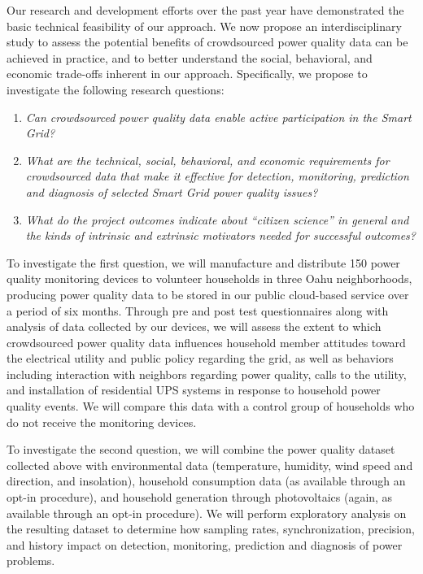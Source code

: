 Our research and development efforts over the past year have demonstrated the basic technical feasibility of our approach.   We now propose an interdisciplinary study to assess the potential benefits of crowdsourced power quality data can be achieved in practice, and to better understand the social, behavioral, and economic trade-offs inherent in our approach.  Specifically, we propose to investigate the following research questions:

\begin{enumerate}

\item {\em Can crowdsourced power quality data enable active participation in the Smart Grid?}

\item {\em What are the technical, social, behavioral, and economic requirements for crowdsourced data that make it effective for detection, monitoring, prediction and diagnosis of selected Smart Grid power quality issues?}

\item {\em What do the project outcomes indicate about ``citizen science'' in general and the kinds of intrinsic and extrinsic motivators needed for successful outcomes?}

\end{enumerate}

To investigate the first question, we will manufacture and distribute 150 power quality monitoring devices to volunteer households in three Oahu neighborhoods, producing power quality data to be stored in our public cloud-based service over a period of six months. Through pre and post test questionnaires along with analysis of data collected by our devices, we will assess the extent to which crowdsourced power quality data influences household member attitudes toward the electrical utility and public policy regarding the grid, as well as behaviors including interaction with neighbors regarding power quality, calls to the utility, and installation of residential UPS systems in response to household power quality events.  We will compare this data with a control group of households who do not receive the monitoring devices. 

To investigate the second question, we will combine the power quality dataset collected above with environmental data (temperature, humidity, wind speed and direction, and insolation), household consumption data (as available through an opt-in procedure), and household generation through photovoltaics (again, as available through an opt-in procedure).  We will perform exploratory analysis on the resulting dataset to determine how sampling rates, synchronization, precision, and history impact on detection, monitoring, prediction and diagnosis of power problems.

